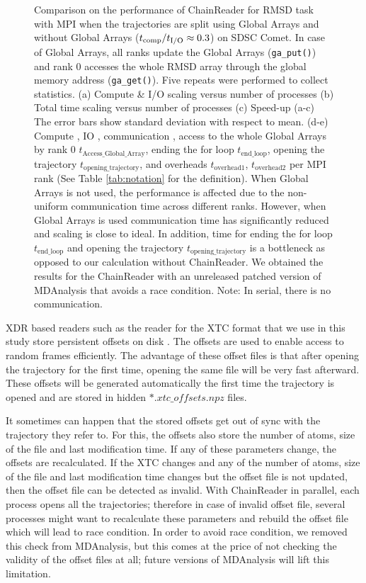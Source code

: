 \begin{figure}[ht!]
\caption{Comparison on the performance of ChainReader for RMSD task with MPI when the trajectories are split using Global Arrays and without Global Arrays (${t}_{\text{comp}}/{t}_{\text{I/O}} \approx 0.3$) on SDSC Comet.
In case of Global Arrays, all ranks update the Global Arrays (\texttt{ga\_put()}) and rank 0 accesses the whole RMSD array through the global memory address (\texttt{ga\_get()}).
Five repeats were performed to collect statistics. (a) Compute \& I/O scaling versus number of processes (b) Total time scaling versus number of processes (c) Speed-up (a-c) The error bars show standard deviation with respect to mean. (d-e) Compute \tcomp, IO \tIO, communication \tcomm, access to the whole Global Arrays by rank 0 $t_{\text{Access\_Global\_Array}}$, ending the for loop $t_{\text{end\_loop}}$,
  opening the trajectory $t_{\text{opening\_trajectory}}$, and overheads $t_{\text{overhead1}}$, $t_{\text{overhead2}}$ per MPI rank (See Table \ref{tab:notation} for the definition). When Global Arrays is not used, the performance is affected due to the non-uniform communication time across different ranks. However, when Global Arrays is used communication time has significantly reduced and scaling is close to ideal. In addition, time for ending the for loop $t_{\text{end\_loop}}$ and 
opening the trajectory $t_{\text{opening\_trajectory}}$ is a bottleneck as opposed to our calculation without ChainReader. We obtained the results for the ChainReader with an unreleased patched version of MDAnalysis that avoids a race condition. Note: In serial, there is no communication.}
\label{fig:MPIwithIO-split-chain-reader}
\end{figure}

XDR based readers such as the reader for the XTC format that we use in this study store persistent offsets on disk \citep{Gowers:2016aa}. 
The offsets are used to enable access to random frames efficiently. 
The advantage of these offset files is that after opening the trajectory for the first time, opening the same file will be very fast afterward. 
These offsets will be generated automatically the first time the trajectory is opened and are stored in hidden $\ast.xtc\_offsets.npz$ files. 

It sometimes can happen that the stored offsets get out of sync with the trajectory they refer to. 
For this, the offsets also store the number of atoms, size of the file and last modification time. 
If any of these parameters change, the offsets are recalculated. 
If the XTC changes and any of the number of atoms, size of the file and last modification time changes but the offset file is not updated, then the offset file can be detected as invalid.
With ChainReader in parallel, each process opens all the trajectories; therefore in case of invalid offset file, several processes might want to recalculate these parameters and rebuild the offset file which will lead to race condition.
In order to avoid race condition, we removed this check from MDAnalysis, but this comes at the price of not checking the validity of the offset files at all; future versions of MDAnalysis will lift this limitation.
 
